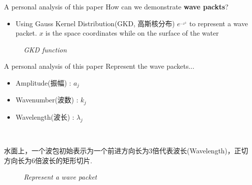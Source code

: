 \documentclass{beamer}
\begin{document}
\begin{frame}{A personal analysis of this paper}
  How can we demonstrate \textbf{\textcolor[rgb]{0,0,1}{wave packts}}?
  \begin{itemize}
    \item Using Gauss Kernel Distribution(GKD, 高斯核分布) $e^_{-x^2}$ to represent a wave packet. $x$ is the space coordinates while on the surface of the water
  \end{itemize}
  \begin{figure}[thpb]
    \centering
    \caption*{\emph{GKD function}}
  \label{fig:system}
  \end{figure}
\end{frame}
\begin{frame}{A personal analysis of this paper}
  Represent the wave packets...
  \begin{itemize}
    \item Amplitude(振幅) : $a_j$
    \item Wavenumber(波数) : $k_j$
    \item Wavelength(波长) : $\lambda_j$
  \end{itemize}
  \\
  \par 水面上，一个波包初始表示为一个前进方向长为3倍代表波长(Wavelength)，正切方向长为6倍波长的矩形切片.
  \begin{figure}[thpb]
    \centering
    \caption*{\emph{Represent a wave packet}}
  \label{fig:system}
  \end{figure}
\end{frame}
\end{document}

